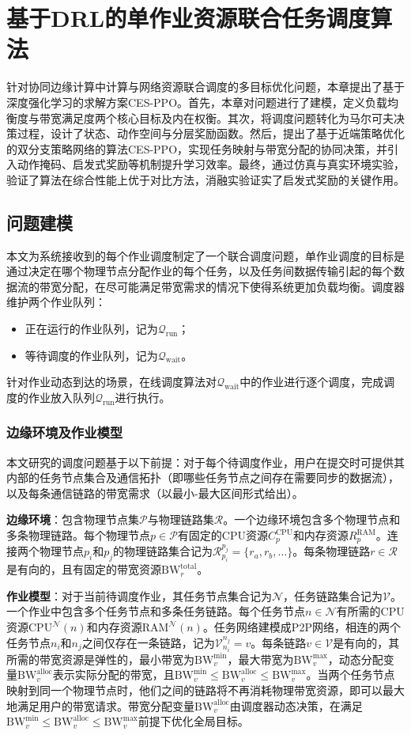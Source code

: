 \chapter{基于DRL的单作业资源联合任务调度算法}
针对协同边缘计算中计算与网络资源联合调度的多目标优化问题，本章提出了基于深度强化学习的求解方案CES-PPO。首先，本章对问题进行了建模，定义负载均衡度与带宽满足度两个核心目标及内在权衡。其次，将调度问题转化为马尔可夫决策过程，设计了状态、动作空间与分层奖励函数。然后，提出了基于近端策略优化的双分支策略网络的算法CES-PPO，实现任务映射与带宽分配的协同决策，并引入动作掩码、启发式奖励等机制提升学习效率。最终，通过仿真与真实环境实验，验证了算法在综合性能上优于对比方法，消融实验证实了启发式奖励的关键作用。
\section{问题建模}
本文为系统接收到的每个作业调度制定了一个联合调度问题，单作业调度的目标是通过决定在哪个物理节点分配作业的每个任务，以及任务间数据传输引起的每个数据流的带宽分配，在尽可能满足带宽需求的情况下使得系统更加负载均衡。调度器维护两个作业队列：
\begin{itemize}
    \item 正在运行的作业队列，记为$\mathcal{Q}_{\text{run}}$；
    \item 等待调度的作业队列，记为$\mathcal{Q}_{\text{wait}}$。
\end{itemize}
针对作业动态到达的场景，在线调度算法对$\mathcal{Q}_{\text{wait}}$中的作业进行逐个调度，完成调度的作业放入队列$\mathcal{Q}_{\text{run}}$进行执行。
\subsection{边缘环境及作业模型}
本文研究的调度问题基于以下前提：对于每个待调度作业，用户在提交时可提供其内部的任务节点集合及通信拓扑（即哪些任务节点之间存在需要同步的数据流），以及每条通信链路的带宽需求（以最小-最大区间形式给出）。

\textbf{边缘环境}：包含物理节点集$\mathcal{P}$与物理链路集$\mathcal{R}$。一个边缘环境包含多个物理节点和多条物理链路。每个物理节点$p \in \mathcal{P}$有固定的CPU资源$C_p^{\text{CPU}}$和内存资源$R_p^{\text{RAM}}$。连接两个物理节点$p_i$和$p_j$的物理链路集合记为$\mathcal{R}_{p_i}^{p_j}=\{r_a,r_b,\dots\}$。每条物理链路$r \in \mathcal{R}$是有向的，且有固定的带宽资源$\text{BW}_r^{\text{total}}$。

\textbf{作业模型}：对于当前待调度作业，其任务节点集合记为$\mathcal{N}$，任务链路集合记为$\mathcal{V}$。一个作业中包含多个任务节点和多条任务链路。每个任务节点$n \in \mathcal{N}$有所需的CPU资源$\text{CPU}^\mathcal{N}(n)$和内存资源$\text{RAM}^\mathcal{N}(n)$。任务网络建模成P2P网络，相连的两个任务节点$n_i$和$n_j$之间仅存在一条链路，记为$\mathcal{V}_{n_i}^{n_j}=v$。每条链路$v \in \mathcal{V}$是有向的，其所需的带宽资源是弹性的，最小带宽为$\text{BW}_v^{\min}$，最大带宽为$\text{BW}_v^{\max}$，动态分配变量$\text{BW}_v^{\text{alloc}}$表示实际分配的带宽，且$\text{BW}_v^{\min} \leq \text{BW}_v^{\text{alloc}} \leq \text{BW}_v^{\max}$。当两个任务节点映射到同一个物理节点时，他们之间的链路将不再消耗物理带宽资源，即可以最大地满足用户的带宽请求。带宽分配变量$\text{BW}_v^{\text{alloc}}$由调度器动态决策，在满足$\text{BW}_v^{\min} \leq \text{BW}_v^{\text{alloc}} \leq \text{BW}_v^{\max}$前提下优化全局目标。

